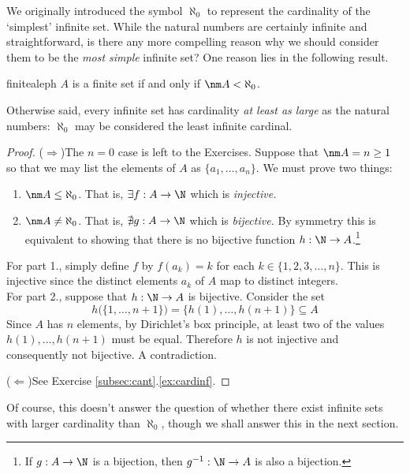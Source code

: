 
We originally introduced the symbol $\aleph_0$ to represent the cardinality of the `simplest' infinite set. While the natural numbers are certainly infinite and straightforward, is there any more compelling reason why we should consider them to be the \emph{most simple} infinite set? One reason lies in the following result.

\begin{thm}{}{finitealeph}
	$A$ is a finite set if and only if $\nm A<\aleph_0$.
\end{thm}

Otherwise said, every infinite set has cardinality \emph{at least as large} as the natural numbers: $\aleph_0$ may be considered the least infinite cardinal.

\begin{proof}
	($\Longrightarrow$)\quad The $n=0$ case is left to the Exercises. Suppose that $\nm A=n\ge 1$ so that we may list the elements of $A$ as $\{a_1,\ldots,a_n\}$. We must prove two things:
	\begin{enumerate}
	  \item $\nm A\le\aleph_0$. That is, $\exists f:A\to\N$ which is \emph{injective.}
	  \item $\nm A\neq\aleph_0$. That is, $\nexists g:A\to\N$ which is \emph{bijective.} By symmetry this is equivalent to showing that there is no bijective function $h:\N\to A$.\footnote{If $g:A\to\N$ is a bijection, then $g^{-1}:\N\to A$ is also a bijection.}
	\end{enumerate}
	For part 1., simply define $f$ by $f(a_k)=k$ for each $k\in\{1,2,3,\ldots,n\}$. This is injective since the distinct elements $a_k$ of $A$ map to distinct integers.\\
	For part 2., suppose that $h:\N\to A$ is bijective. Consider the set
	\[
		h\bigl(\{1,\ldots,n+1\}\bigr)=\bigl\{h(1),\ldots,h(n+1)\bigr\}\subseteq A
	\]
	Since $A$ has $n$ elements, by Dirichlet's box principle, at least two of the values $h(1),\ldots,h(n+1)$ must be equal. Therefore $h$ is not injective and consequently not bijective. A contradiction.\par
	($\Longleftarrow$)\quad See Exercise \ref*{subsec:cant}.\ref{ex:cardinf}.
\end{proof}

Of course, this doesn't answer the question of whether there exist infinite sets with larger cardinality than $\aleph_0$, though we shall answer this in the next section.

